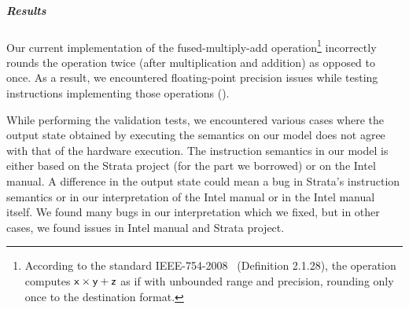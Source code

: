 
\vspace{-2pt}
\subparagraph{Results}

Our current implementation of the fused-multiply-add operation\footnote{According to the standard IEEE-754-2008~\cite{FP} (Definition 2.1.28), the operation  computes $\textsf{x} \times \textsf{y} + \textsf{z}$ as if with unbounded range and precision, rounding only once to the destination format.} incorrectly rounds the operation twice (after multiplication and addition) as opposed to once. As a result, we encountered floating-point precision issues while testing instructions implementing those operations ().
 
 
While performing the validation tests, we encountered various cases where the output state obtained by executing the semantics on our model does not agree with that of the hardware execution. 
The instruction semantics in our model is either based on the Strata project (for the part we borrowed) or on the Intel manual. A difference in the output state could mean a bug in Strata's instruction semantics or in our interpretation of the Intel manual or in the Intel manual itself. We found many bugs in our interpretation which we fixed, but in other cases, we found issues  in Intel manual and Strata project.

